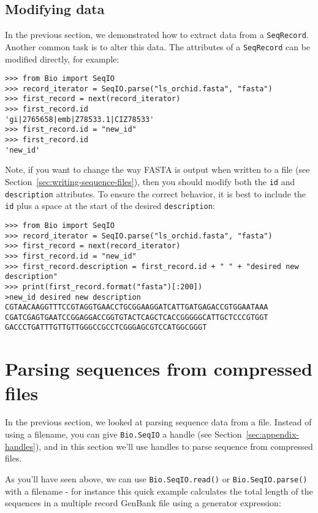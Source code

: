 \subsection{Modifying data}

In the previous section, we demonstrated how to extract data from a
\verb|SeqRecord|. Another common task is to alter this data. The attributes
of a \verb|SeqRecord| can be modified directly, for example:

\begin{verbatim}
>>> from Bio import SeqIO
>>> record_iterator = SeqIO.parse("ls_orchid.fasta", "fasta")
>>> first_record = next(record_iterator)
>>> first_record.id
'gi|2765658|emb|Z78533.1|CIZ78533'
>>> first_record.id = "new_id"
>>> first_record.id
'new_id'
\end{verbatim}

Note, if you want to change the way FASTA is output when written to a file
(see Section~\ref{sec:writing-sequence-files}), then you should modify both
the \verb|id| and \verb|description| attributes. To ensure the correct
behavior, it is best to include the \verb|id| plus a space at the start of
the desired \verb|description|:

\begin{verbatim}
>>> from Bio import SeqIO
>>> record_iterator = SeqIO.parse("ls_orchid.fasta", "fasta")
>>> first_record = next(record_iterator)
>>> first_record.id = "new_id"
>>> first_record.description = first_record.id + " " + "desired new description"
>>> print(first_record.format("fasta")[:200])
>new_id desired new description
CGTAACAAGGTTTCCGTAGGTGAACCTGCGGAAGGATCATTGATGAGACCGTGGAATAAA
CGATCGAGTGAATCCGGAGGACCGGTGTACTCAGCTCACCGGGGGCATTGCTCCCGTGGT
GACCCTGATTTGTTGTTGGGCCGCCTCGGGAGCGTCCATGGCGGGT
\end{verbatim}

\section{Parsing sequences from compressed files}
\label{sec:SeqIO_compressed}
In the previous section, we looked at parsing sequence data from a file.
Instead of using a filename, you can give \verb|Bio.SeqIO| a handle
(see Section~\ref{sec:appendix-handles}), and in this section
we'll use handles to parse sequence from compressed files.

As you'll have seen above, we can use \verb|Bio.SeqIO.read()| or
\verb|Bio.SeqIO.parse()| with a filename - for instance this quick
example calculates the total length of the sequences in a multiple
record GenBank file using a generator expression:

